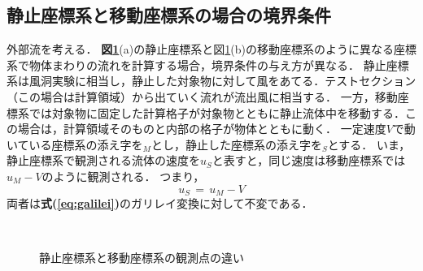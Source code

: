 \pagebreak
%
\subsection{静止座標系と移動座標系の場合の境界条件}
\label{sec:moving_grid}
外部流を考える．
\textbf{図\ref{fig:reference_frame}}(a)の静止座標系と{図\ref{fig:reference_frame}}(b)の移動座標系のように異なる座標系で物体まわりの流れを計算する場合，境界条件の与え方が異なる．
静止座標系は風洞実験に相当し，静止した対象物に対して風をあてる．テストセクション（この場合は計算領域）から出ていく流れが流出風に相当する．
一方，移動座標系では対象物に固定した計算格子が対象物とともに静止流体中を移動する．この場合は，計算領域そのものと内部の格子が物体とともに動く．
一定速度$V$で動いている座標系の添え字を${}_M$とし，静止した座標系の添え字を${}_S$とする．
いま，静止座標系で観測される流体の速度を$u_{S}$と表すと，同じ速度は移動座標系では$u_{M}-V$のように観測される．
つまり，
\begin{equation}
u_{S} \, = \, u_{M}-V
\label{eq:galilei}
\end{equation}
両者は\textbf{式(\ref{eq:galilei})}のガリレイ変換に対して不変である．

\begin{figure}[htbp]
\begin{center}
~
\caption{静止座標系と移動座標系の観測点の違い} 
\label{fig:reference_frame}
\end{center}
\end{figure}

